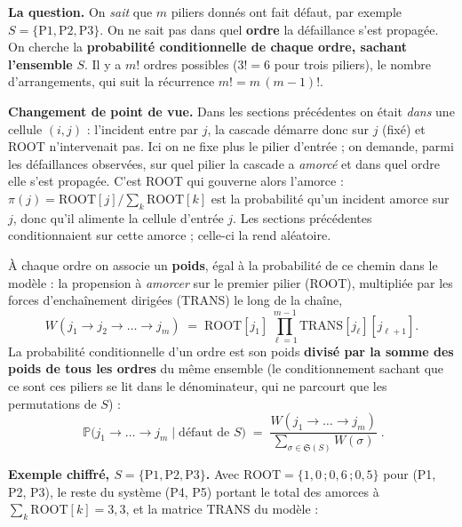 \documentclass[11pt,a4paper]{article}
\begin{document}
\begin{cle}
\textbf{La question.} On \emph{sait} que $m$ piliers donnés ont fait défaut, par exemple
$S=\{\text{P1},\text{P2},\text{P3}\}$. On ne sait pas dans quel \textbf{ordre} la défaillance
s'est propagée. On cherche la \textbf{probabilité conditionnelle de chaque ordre, sachant
l'ensemble} $S$. Il y a $m!$ ordres possibles ($3!=6$ pour trois piliers), le nombre
d'arrangements, qui suit la récurrence $m! = m\,(m-1)!$.
\end{cle}

\noindent\textbf{Changement de point de vue.} Dans les sections précédentes on était \emph{dans}
une cellule $(i,j)$ : l'incident entre par $j$, la cascade démarre donc sur $j$ (fixé) et ROOT
n'intervenait pas. Ici on ne fixe plus le pilier d'entrée ; on demande, parmi les défaillances
observées, sur quel pilier la cascade a \emph{amorcé} et dans quel ordre elle s'est propagée.
C'est ROOT qui gouverne alors l'amorce : $\pi(j)=\text{ROOT}[j]/\sum_k\text{ROOT}[k]$ est la
probabilité qu'un incident amorce sur $j$, donc qu'il alimente la cellule d'entrée $j$. Les
sections précédentes conditionnaient sur cette amorce ; celle-ci la rend aléatoire.

À chaque ordre on associe un \textbf{poids}, égal à la probabilité de ce chemin dans le modèle :
la propension à \emph{amorcer} sur le premier pilier (ROOT), multipliée par les forces
d'enchaînement dirigées (TRANS) le long de la chaîne,
\begin{equation}
W(j_1 \to j_2 \to \dots \to j_m) \;=\; \text{ROOT}[j_1]\,\prod_{\ell=1}^{m-1}\text{TRANS}[j_\ell][j_{\ell+1}].
\end{equation}
La probabilité conditionnelle d'un ordre est son poids \textbf{divisé par la somme des poids de
tous les ordres} du même ensemble (le conditionnement \og{}sachant que ce sont ces piliers\fg{}
se lit dans le dénominateur, qui ne parcourt que les permutations de $S$) :
\begin{equation}
\boxed{\;\mathbb P\big(j_1 \to \dots \to j_m \;\big|\; \text{défaut de } S\big)
\;=\; \frac{W(j_1 \to \dots \to j_m)}{\displaystyle\sum_{\sigma \in \mathfrak S(S)} W(\sigma)}\;.}
\end{equation}

\noindent\textbf{Exemple chiffré, $S=\{\text{P1},\text{P2},\text{P3}\}$.} Avec
$\text{ROOT}=\{1{,}0\,;0{,}6\,;0{,}5\}$ pour (P1, P2, P3), le reste du système (P4, P5)
portant le total des amorces à $\sum_k\text{ROOT}[k]=3{,}3$, et la matrice TRANS du modèle :
\end{document}
